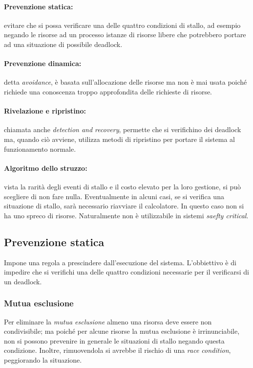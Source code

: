 \documentclass[a4paper,12pt, twoside]{report}
\begin{document}
\paragraph{Prevenzione statica:}
evitare che si possa verificare una delle quattro condizioni di stallo, ad esempio negando le risorse ad un processo
istanze di risorse libere che potrebbero portare ad una situazione di possibile deadlock.

\paragraph{Prevenzione dinamica:}
detta \emph{avoidance}, \`e basata sull'allocazione delle risorse ma non \`e mai usata poich\'e richiede una conoscenza
troppo approfondita delle richieste di risorse.

\paragraph{Rivelazione e ripristino:}
chiamata anche \emph{detection and recovery}, permette che si verifichino dei deadlock ma, quando ci\`o avviene, utilizza
metodi di ripristino per portare il sistema al funzionamento normale.

\paragraph{Algoritmo dello struzzo:}
vista la rarit\`a degli eventi di stallo e il costo elevato per la loro gestione, si pu\`o scegliere di non fare nulla.
Eventualmente in alcuni casi, se si verifica una situazione di stallo, sar\`a necessario riavviare il calcolatore. In
questo caso non si ha uno spreco di risorse. Naturalmente non \`e utilizzabile in sistemi \emph{saefty critical}.

\subsection{Prevenzione statica}

Impone una regola a prescindere dall'esecuzione del sistema. L'obbiettivo \`e di impedire che si verifichi una delle
quattro condizioni necessarie per il verificarsi di un deadlock.

\subsubsection{Mutua esclusione}
Per eliminare la \emph{mutua esclusione} almeno una risorsa deve essere non condivisibile; ma poich\'e per alcune risorse
la mutua esclusione \`e irrinunciabile, non si possono prevenire in generale le situazioni di stallo negando questa condizione.
Inoltre, rimuovendola si avrebbe il rischio di una \emph{race condition}, peggiorando la situazione.
\end{document}
